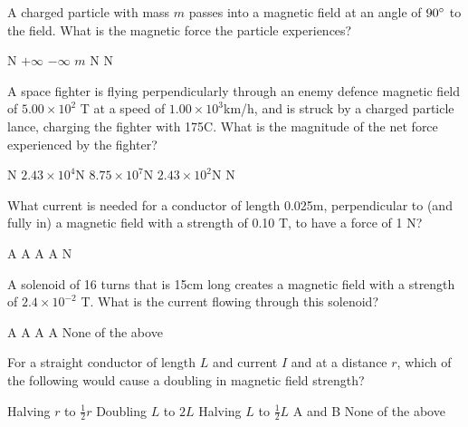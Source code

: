 \documentclass[a4paper,12pt]{exam}
\begin{document}
\begin{questions}

\question A charged particle with mass $m$ passes into a magnetic field at an angle of $90 \degree$ to the field. What is the magnetic force the particle experiences?

\begin{oneparchoices}
     N
    \choice $+ \infty$
    \choice $- \infty$
    \choice $m$ N
     N
\end{oneparchoices}

\question A space fighter is flying perpendicularly through an enemy defence magnetic field of $5.00 \times 10^2$ T at a speed of $1.00 \times 10^3$km/h, and is struck by a charged particle lance, charging the fighter with 175C. What is the magnitude of the net force experienced by the fighter?

\begin{oneparchoices}
     N
    \choice $2.43 \times 10^4$N
    \choice $8.75 \times 10^7$N
    \choice $2.43 \times 10^2$N
     N
\end{oneparchoices}

\question What current is needed for a conductor of length 0.025m, perpendicular to (and fully in) a magnetic field with a strength of 0.10 T, to have a force of 1 N?

\begin{oneparchoices}
     A
     A
     A
     A
     N
\end{oneparchoices}

\question A solenoid of 16 turns that is 15cm long creates a magnetic field with a strength of $2.4 \times 10^{-2}$ T. What is the current flowing through this solenoid?

\begin{oneparchoices}
     A
     A
     A
     A
    \choice None of the above
\end{oneparchoices}

\question For a straight conductor of length $L$ and current $I$ and at a distance $r$, which of the following would cause a doubling in magnetic field strength?

\begin{oneparchoices}
    \choice Halving $r$ to $\frac{1}{2}r$
    \choice Doubling $L$ to $2L$
    \choice Halving $L$ to $\frac{1}{2}L$
    \choice A and B
    \choice None of the above
\end{oneparchoices}

\end{questions}
\end{document}
